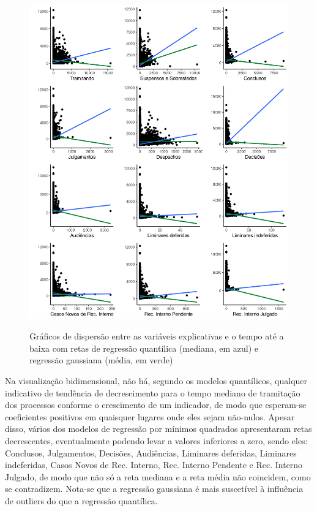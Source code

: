 \begin{figure}[H]
    \centering
    \caption{Gráficos de dispersão entre as variáveis explicativas e o tempo até a baixa com retas de regressão quantílica (mediana, em azul) e regressão gaussiana (média, em verde)}
    \includegraphics[scale=.745]{imagens/cross_charts.png}
    \label{fig:cross_charts}
\end{figure}

Na visualização bidimensional, não há, segundo os modelos quantílicos, qualquer indicativo de tendência de decrescimento para o tempo mediano de tramitação dos processos conforme o crescimento de um indicador, de modo que esperam-se coeficientes positivos em quaisquer lugares onde eles sejam não-nulos. Apesar disso, vários dos modelos de regressão por mínimos quadrados apresentaram retas decrescentes, eventualmente podendo levar a valores inferiores a zero, sendo eles: Conclusos, Julgamentos, Decisões, Audiências, Liminares deferidas, Liminares indeferidas, Casos Novos de Rec. Interno, Rec. Interno Pendente e Rec. Interno Julgado, de modo que não só a reta mediana e a reta média não coincidem, como se contradizem. Nota-se que a regressão gaussiana é mais suscetível à influência de outliers do que a regressão quantílica.

